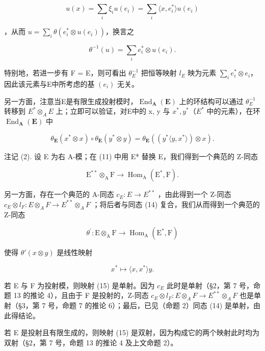 \[
u (x) = \sum_ {i} \xi_ {i} u (e _ {i}) = \sum_ {i} \langle x, e _ {i} ^ {*} \rangle u (e _ {i})
\]

，从而 \(u = \sum_{i} \theta(e_i^* \otimes u(e_i))\)，换言之

\[
\theta^ {- 1} (u) = \sum_ {i} e _ {i} ^ {*} \otimes u (e _ {i}).\tag{12}
\]

特别地，若进一步有 F = E，则可看出 \(\theta_{E}^{-1}\) 把恒等映射 \(l_{E}\) 映为元素 \(\sum_{i} e_{i}^{*} \otimes e_{i}\)，因此该元素与E中所考虑的基 \((e_{i})\) 无关。

另一方面，注意当E是有限生成投射模时，\(\operatorname{End}_{\mathbf{A}}(\mathbf{E})\) 上的环结构可以通过 \(\theta_{E}^{-1}\) 转移到 \(E^{*}\otimes_{A}E\) 上；立即可以验证，对E中的 x, y 与 \(x^{*}, y^{*}\)（\(E^{*}\) 中的元素），在环 \(\operatorname{End}_{\mathbf{A}}(\mathbf{E})\) 中

\[
\theta_ {\mathbf {E}} (x ^ {*} \otimes x) \circ \theta_ {\mathbf {E}} (y ^ {*} \otimes y) = \theta_ {\mathbf {E}} ((y ^ {*} \langle y, x ^ {*} \rangle) \otimes x).\tag{13}
\]

注记 (2). 设 E 为右 A-模；在 (11) 中用 E* 替换 E，我们得到一个典范的 Z-同态

\[
\mathrm{E} ^ {* *} \otimes_ {\mathrm{A}} \mathrm{F} \rightarrow \operatorname{Hom} _ {\mathrm{A}} (\mathrm{E} ^ {*}, \mathrm{F}).\tag{14}
\]

另一方面，存在一个典范的 A-同态 \(c_{E}:E\to E^{**}\) ，由此得到一个 Z-同态 \(c_{E}\otimes l_{F}:E\otimes_{A}F\to E^{**}\otimes_{A}F\) ；将后者与同态 (14) 复合，我们从而得到一个典范的 Z-同态

\[
\theta^ {\prime}: \mathrm{E} \otimes_ {\mathrm{A}} \mathrm{F} \rightarrow \operatorname{Hom} _ {\mathrm{A}} (\mathrm{E} ^ {*}, \mathrm{F})\tag{15}
\]

使得 \(\theta'(x \otimes y)\) 是线性映射

\[
x ^ {*} \mapsto \langle x, x ^ {*} \rangle y.
\]

若 E 与 F 为投射模，则映射 (15) 是单射。因为 \(c_{E}\) 此时是单射（§2，第 7 号，命题 13 的推论 4），且由于 F 是投射的，Z-同态 \(c_{E} \otimes l_{F}: E \otimes_{A} F \to E^{**} \otimes_{A} F\) 也是单射（§3，第 7 号，命题 7 的推论 6）；最后，已见（命题 2）同态 (14) 是单射，由此得结论。

若 E 是投射且有限生成的，则映射 (15) 是双射，因为构成它的两个映射此时均为双射（§2，第 7 号，命题 13 的推论 4 及上文命题 2）。

